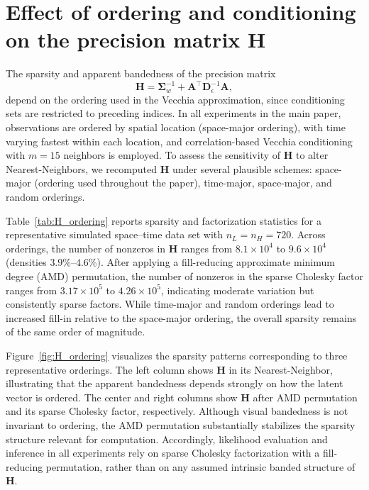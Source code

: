 \documentclass[12pt]{article}
\begin{document}
\section{Effect of ordering and conditioning on the precision matrix $\mathbf{H}$}
\label{sec:supp_ordering_H}

The sparsity and apparent bandedness of the precision matrix
\[
\bm{H} = \boldsymbol{\Sigma}_w^{-1} + \bm{A}^\top \bm{D}_\epsilon^{-1} \bm{A},
\]
depend on the ordering used in the Vecchia approximation, since conditioning
sets are restricted to preceding indices.
In all experiments in the main paper, observations are ordered by spatial
location (space-major ordering), with time varying fastest within each
location, and correlation-based Vecchia conditioning with $m=15$ neighbors
is employed.
To assess the sensitivity of $\bm{H}$ to alter Nearest-Neighbors, we
recomputed $\bm{H}$ under several plausible schemes: space-major
(ordering used throughout the paper), time-major, space-major, and random
orderings.

Table~\ref{tab:H_ordering} reports sparsity and factorization statistics for
a representative simulated space--time data set with $n_L = n_H = 720$.
Across orderings, the number of nonzeros in $\bm{H}$ ranges from
$8.1\times 10^4$ to $9.6\times 10^4$ (densities $3.9\%$--$4.6\%$).
After applying a fill-reducing approximate minimum degree (AMD) permutation,
the number of nonzeros in the sparse Cholesky factor ranges from
$3.17\times 10^5$ to $4.26\times 10^5$, indicating moderate variation but
consistently sparse factors.
While time-major and random orderings lead to increased fill-in relative to
the space-major ordering, the overall sparsity remains of the same order
of magnitude.

Figure~\ref{fig:H_ordering} visualizes the sparsity patterns corresponding to
three representative orderings.
The left column shows $\bm{H}$ in its Nearest-Neighbor, illustrating that
the apparent bandedness depends strongly on how the latent vector is ordered.
The center and right columns show $\bm{H}$ after AMD permutation and its
sparse Cholesky factor, respectively.
Although visual bandedness is not invariant to ordering, the AMD permutation
substantially stabilizes the sparsity structure relevant for computation.
Accordingly, likelihood evaluation and inference in all experiments rely on
sparse Cholesky factorization with a fill-reducing permutation, rather than
on any assumed intrinsic banded structure of $\bm{H}$.
\end{document}
